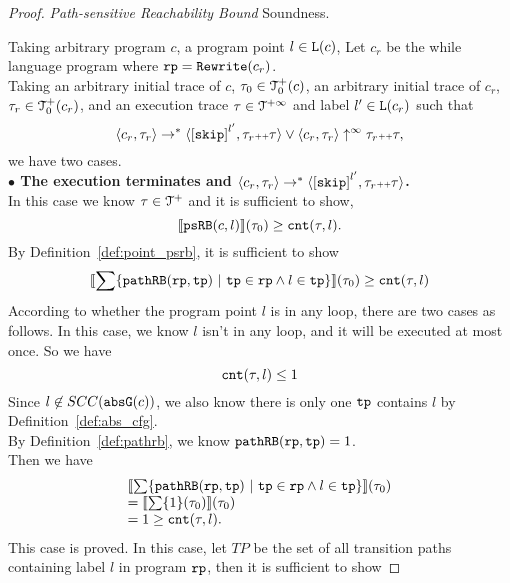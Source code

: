\begin{proof} \emph{Path-sensitive Reachability Bound} Soundness.

    Taking arbitrary program $c$, a program point $l \in \mathtt{L}(c)$,
    Let $c_r$ be the while language program where $\mathtt{rp} = \mathtt{Rewrite}(c_r)$.
    \\
    Taking an arbitrary initial trace of $c$, $\mathtt{\tau}_0 \in \mathcal{T}^{+}_0(c)$, an arbitrary initial trace of $c_r$, $\mathtt{\tau}_r \in \mathcal{T}^{+}_0(c_r)$, and an execution trace $\mathtt{\tau} \in \mathcal{T}^{+\infty}$ and label $l' \in \mathtt{L}(c_r)$
   such that 
   \[
    \config{{c_r}, \trace_r} \to^{*} \config{\clabel{\eskip}^{l'}, \trace_r \tracecat \trace} \lor \config{c_r, \trace_r} \uparrow^{\infty} \trace_r \tracecat \trace,
    \]
   we have two cases.
  \\
  \textbf{$\bullet$ The execution terminates and {$\config{{c_r}, \trace_r} \to^{*} \config{\clabel{\eskip}^{l'}, \trace_r \tracecat \trace}$}.} 
  \\
  In this case we know $\mathtt{\tau} \in \mathcal{T}^{+}$ and it is sufficient to show,
    \[
    \llbracket \mathtt{psRB}(c, l) \rrbracket(\mathtt{\tau}_0) \geq \mathtt{cnt}(\mathtt{\tau}, l) .
    \]
    By Definition~\ref{def:point_psrb}, it is sufficient to show 
    \[
    \econfig{
        \sum \left\{ \inoutB(\rprog, \tpath) ~\vert~ \tpath \in \rprog \land l \in \tpath \right\}
        }(\trace_0)  \geq  \counter(\trace, l)
    \]
    According to whether the program point $l$ is in any loop, there are two cases as follows.
    In this case, we know $l$ isn't in any loop, and it will be executed at most once. So we have
    \[ 
        \mathtt{cnt}(\mathtt{\tau}, l) \leq 1
    \]
    Since $l \not\in SCC(\mathtt{abs}{\mathtt{G}}(c))$, we also know there is only one $\mathtt{tp}$ contains $l$ by Definition~\ref{def:abs_cfg}.
    \\
    By Definition~\ref{def:pathrb}, we know $\mathtt{pathRB}(\mathtt{rp}, \mathtt{tp}) = 1$.
    \\
    Then we have 
    \[
        \begin{array}{l}
        \econfig{
        \sum \left\{ \inoutB(\rprog, \tpath) ~\vert~ \tpath \in \rprog \land l \in \tpath \right\}
        }(\trace_0)
        \\ =  \econfig{ \sum \left\{ 1 \right\}(\trace_0)}(\trace_0)
        \\ =  1 \geq \counter(\trace, l).
        \end{array}
        \]
    This case is proved.
    In this case, let $TP$ be the set of all transition paths containing 
    label $l$ in program $\mathtt{rp}$, then it is sufficient to show 

\end{proof}
